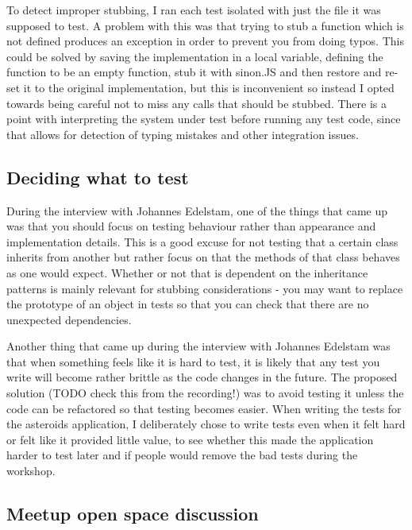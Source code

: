 \documentclass[11pt]{article}
\begin{document}
To detect improper stubbing, I ran each test isolated with just the file it was supposed to test. A problem with this was that trying to stub a function which is not defined produces an exception in order to prevent you from doing typos. This could be solved by saving the implementation in a local variable, defining the function to be an empty function, stub it with sinon.JS and then restore and re-set it to the original implementation, but this is inconvenient so instead I opted towards being careful not to miss any calls that should be stubbed. There is a point with interpreting the system under test before running any test code, since that allows for detection of typing mistakes and other integration issues.

\subsection{Deciding what to test}

During the interview with Johannes Edelstam, one of the things that came up was that you should focus on testing behaviour rather than appearance and implementation details. This is a good excuse for not testing that a certain class inherits from another but rather focus on that the methods of that class behaves as one would expect. Whether or not that is dependent on the inheritance patterns is mainly relevant for stubbing considerations - you may want to replace the prototype of an object in tests so that you can check that there are no unexpected dependencies.

Another thing that came up during the interview with Johannes Edelstam was that when something feels like it is hard to test, it is likely that any test you write will become rather brittle as the code changes in the future. The proposed solution (TODO check this from the recording!) was to avoid testing it unless the code can be refactored so that testing becomes easier. When writing the tests for the asteroids application, I deliberately chose to write tests even when it felt hard or felt like it provided little value, to see whether this made the application harder to test later and if people would remove the bad tests during the workshop.

\subsection{Meetup open space discussion}
\label{sec:openspace}
\end{document}
